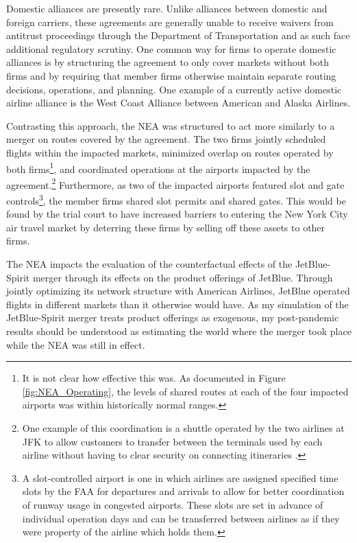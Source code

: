 \documentclass{article}
\begin{document}
	Domestic alliances are presently rare. Unlike alliances between domestic and foreign carriers, these agreements are generally unable to receive waivers from antitrust proceedings through the Department of Transportation and as such face additional regulatory scrutiny. One common way for firms to operate domestic alliances is by structuring the agreement to only cover markets without both firms and by requiring that member firms otherwise maintain separate routing decisions, operations, and planning. One example of a currently active domestic airline alliance is the West Coast Alliance between American and Alaska Airlines.  
	
	Contrasting this approach, the NEA was structured to act more similarly to a merger on routes covered by the agreement. The two firms jointly scheduled flights within the impacted markets, minimized overlap on routes operated by both firms\footnote{It is not clear how effective this was. As documented in Figure \ref{fig:NEA_Operating}, the levels of shared routes at each of the four impacted airports was within historically normal ranges.}, and coordinated operations at the airports impacted by the agreement.\footnote{One example of this coordination is a shuttle operated by the two airlines at JFK to allow customers to transfer between the terminals used by each airline without having to clear security on connecting itineraries \citep{griff_riding_2021}.} Furthermore, as two of the impacted airports featured slot and gate controls\footnote{A slot-controlled airport is one in which airlines are assigned specified time slots by the FAA for departures and arrivals to allow for better coordination of runway usage in congested airports. These slots are set in advance of individual operation days and can be transferred between airlines as if they were property of the airline which holds them.}, the member firms shared slot permits and shared gates. This would be found by the trial court to have increased barriers to entering the New York City air travel market by deterring these firms by selling off these assets to other firms. 
    
    The NEA impacts the evaluation of the counterfactual effects of the JetBlue-Spirit merger through its effects on the product offerings of JetBlue. Through jointly optimizing its network structure with American Airlines, JetBlue operated flights in different markets than it otherwise would have. As my simulation of the JetBlue-Spirit merger treats product offerings as exogenous, my post-pandemic results should be understood as estimating the world where the merger took place while the NEA was still in effect. 
\end{document}
